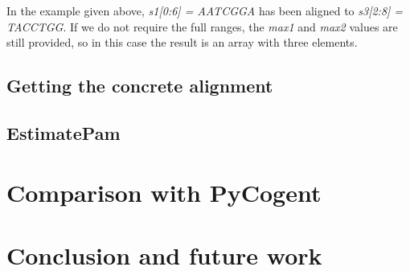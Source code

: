 \documentclass[12pt]{article}
\begin{document}
In the example given above, \emph{s1[0:6] = AATCGGA} has been aligned to \emph{s3[2:8] = TACCTGG}. If we do not require the full ranges, the \emph{max1} and \emph{max2} values are still provided, so in this case the result is an array with three elements.

\subsection{Getting the concrete alignment}
\label{subsec:concrete}

\subsection{EstimatePam}
\label{subsec:EPam}

\section{Comparison with PyCogent}
\label{sec:compCogent}

\section{Conclusion and future work}
\label{sec:concl}
\end{document}
